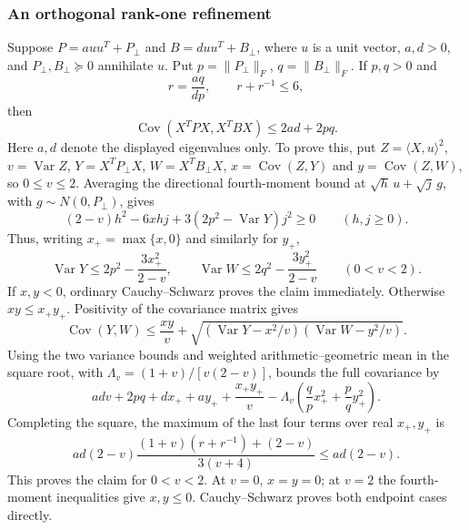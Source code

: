 \documentclass[11pt,a4paper]{article}
\numberwithin{equation}{section}
\begin{document}
\subsubsection{An orthogonal rank-one refinement}
Suppose $P=a uu^T+P_{\perp}$ and $B=d uu^T+B_{\perp}$, where $u$ is a
unit vector, $a,d>0$, and $P_{\perp},B_{\perp}\succeq0$ annihilate $u$.
Put $p=\|P_{\perp}\|_F$, $q=\|B_{\perp}\|_F$. If $p,q>0$ and
\begin{equation}\label{eq:app-K-one-rankone-ratio}
 r=\frac{aq}{dp},\qquad r+r^{-1}\le6,
\end{equation}
then
\begin{equation}\label{eq:app-K-one-rankone-covariance}
 \operatorname{Cov}(X^TPX,X^TBX)\le2ad+2pq.
\end{equation}
Here $a,d$ denote the displayed eigenvalues only.
To prove this, put $Z=\langle X,u\rangle^2$, $v=\operatorname{Var}Z$,
$Y=X^TP_{\perp}X$, $W=X^TB_{\perp}X$, $x=\operatorname{Cov}(Z,Y)$
and $y=\operatorname{Cov}(Z,W)$, so $0\le v\le2$.
Averaging the directional fourth-moment bound at
$\sqrt h\,u+\sqrt j\,g$, with $g\sim N(0,P_{\perp})$, gives
\[
 (2-v)h^2-6xhj+3(2p^2-\operatorname{Var}Y)j^2\ge0
 \qquad(h,j\ge0).
\]
Thus, writing $x_+=\max\{x,0\}$ and similarly for $y_+$,
\[
 \operatorname{Var}Y\le2p^2-\frac{3x_+^2}{2-v},\qquad
 \operatorname{Var}W\le2q^2-\frac{3y_+^2}{2-v}
 \qquad(0<v<2).
\]
If $x,y<0$, ordinary Cauchy--Schwarz proves the claim immediately.
Otherwise $xy\le x_+y_+$. Positivity of the covariance matrix gives
\[
 \operatorname{Cov}(Y,W)\le\frac{xy}{v}
 +\sqrt{(\operatorname{Var}Y-x^2/v)(\operatorname{Var}W-y^2/v)}.
\]
Using the two variance bounds and weighted arithmetic--geometric mean
in the square root, with $\Lambda_v=(1+v)/[v(2-v)]$, bounds the full covariance by
\[
 adv+2pq+dx_++ay_++\frac{x_+y_+}{v}
       -\Lambda_v\left(\frac qp x_+^2+\frac pq y_+^2\right).
\]
Completing the square, the maximum of the last four terms over real
$x_+,y_+$ is
\[
 ad(2-v)\frac{(1+v)(r+r^{-1})+(2-v)}{3(v+4)}
 \le ad(2-v).
\]
This proves the claim for $0<v<2$. At $v=0$, $x=y=0$; at $v=2$ the
fourth-moment inequalities give $x,y\le0$. Cauchy--Schwarz proves
both endpoint cases directly.
\end{document}
